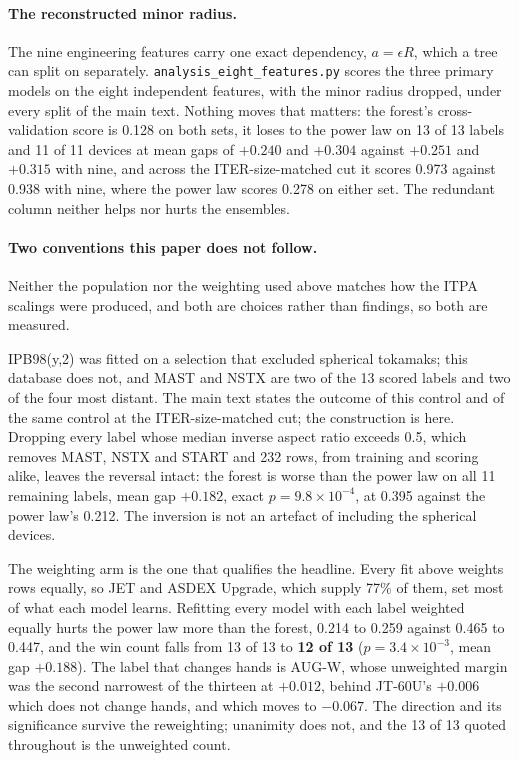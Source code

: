 \documentclass[12pt,letterpaper]{article}
\begin{document}
\paragraph{The reconstructed minor radius.} The nine engineering features
carry one exact dependency, $a=\epsilon R$, which a tree can split on
separately. \texttt{analysis\_eight\_features.py} scores the three primary
models on the eight independent features, with the minor radius dropped,
under every split of the main text. Nothing moves that matters: the forest's
cross-validation score is 0.128 on both sets, it loses to the power law on
13 of 13 labels and 11 of 11 devices at mean gaps of $+0.240$ and $+0.304$
against $+0.251$ and $+0.315$ with nine, and across the ITER-size-matched cut
it scores 0.973 against 0.938 with nine, where the power law scores 0.278 on
either set. The redundant column neither helps nor hurts the ensembles.

\paragraph{Two conventions this paper does not follow.} Neither the population
nor the weighting used above matches how the ITPA scalings were produced, and
both are choices rather than findings, so both are measured.

IPB98(y,2) was fitted on a selection that excluded spherical tokamaks; this
database does not, and MAST and NSTX are two of the 13 scored labels and two of
the four most distant. The main text states the outcome of this control and of the same control at
the ITER-size-matched cut; the construction is here. Dropping every label whose median inverse aspect ratio exceeds 0.5, which
removes MAST, NSTX and START and 232 rows, from training and scoring alike,
leaves the reversal intact: the forest is worse than the power law on all 11
remaining labels, mean gap $+0.182$, exact $p=9.8\times10^{-4}$, at 0.395
against the power law's 0.212. The inversion is not an artefact of including
the spherical devices.

The weighting arm is the one that qualifies the headline. Every fit above
weights rows equally, so JET and ASDEX Upgrade, which supply 77\% of them, set
most of what each model learns. Refitting every model with each label weighted
equally hurts the power law more than the forest, 0.214 to 0.259 against 0.465
to 0.447, and the win count falls from 13 of 13 to \textbf{12 of 13}
($p=3.4\times10^{-3}$, mean gap $+0.188$). The label that changes hands is
AUG-W, whose unweighted margin was the second narrowest of the thirteen at
$+0.012$, behind JT-60U's $+0.006$ which does not change hands, and
which moves to $-0.067$. The direction and its significance survive the
reweighting; unanimity does not, and the 13 of 13 quoted throughout is the
unweighted count.
\end{document}
